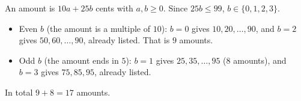 An amount is $10a+25b$ cents with $a,b\ge0$. Since $25b\le99$, $b\in\{0,1,2,3\}$.
\begin{itemize}
\item Even $b$ (the amount is a multiple of $10$): $b=0$ gives $10,20,\ldots,90$, and $b=2$ gives $50,60,\ldots,90$, already listed. That is $9$ amounts.
\item Odd $b$ (the amount ends in $5$): $b=1$ gives $25,35,\ldots,95$ ($8$ amounts), and $b=3$ gives $75,85,95$, already listed.
\end{itemize}
In total $9+8=\boxed{17}$ amounts.
